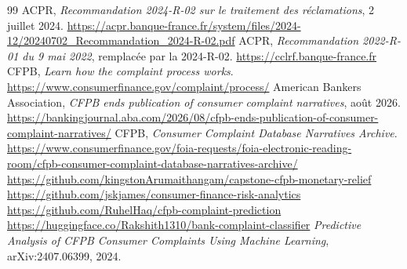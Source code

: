 \documentclass[11pt,a4paper]{article}
\begin{document}
{\raggedright
\begin{thebibliography}{99}
 ACPR, \emph{Recommandation 2024-R-02 sur le traitement des réclamations}, 2 juillet 2024. \url{https://acpr.banque-france.fr/system/files/2024-12/20240702_Recommandation_2024-R-02.pdf}
 ACPR, \emph{Recommandation 2022-R-01 du 9 mai 2022}, remplacée par la 2024-R-02. \url{https://cclrf.banque-france.fr}
 CFPB, \emph{Learn how the complaint process works}. \url{https://www.consumerfinance.gov/complaint/process/}
 American Bankers Association, \emph{CFPB ends publication of consumer complaint narratives}, août 2026. \url{https://bankingjournal.aba.com/2026/08/cfpb-ends-publication-of-consumer-complaint-narratives/}
 CFPB, \emph{Consumer Complaint Database Narratives Archive}. \url{https://www.consumerfinance.gov/foia-requests/foia-electronic-reading-room/cfpb-consumer-complaint-database-narratives-archive/}
 \url{https://github.com/kingstonArumaithangam/capstone-cfpb-monetary-relief}
 \url{https://github.com/jskjames/consumer-finance-risk-analytics}
 \url{https://github.com/RuhelHaq/cfpb-complaint-prediction}
 \url{https://huggingface.co/Rakshith1310/bank-complaint-classifier}
 \emph{Predictive Analysis of CFPB Consumer Complaints Using Machine Learning}, arXiv:2407.06399, 2024.
\end{thebibliography}
}
\end{document}
